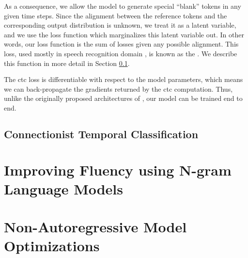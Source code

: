 As a consequence, we allow the model to generate special ``blank'' tokens in
any given time steps. Since the alignment between the reference tokens and the
corresponding output distribution is unknown, we treat it as a latent variable,
and we use the loss function which marginalizes this latent variable out. In
other words, our loss function is the sum of losses given any possible
alignment. This loss, used mostly in speech recognition domain
\citep{graves2006connectionist}, is known as the . We describe
this function in more detail in Section \ref{subsec:ctc}.

The \gls{ctc} loss is differentiable with respect to the model parameters,
which means we can back-propagate the gradients returned by the \gls{ctc}
computation. Thus, unlike the originally proposed architectures of
\citet{gu2017nonautoregressive}, our model can be trained end to end.


\subsection{Connectionist Temporal Classification}
\label{subsec:ctc}






\section{Improving Fluency using N-gram Language Models}
\label{sec:nat-lm}





\section{Non-Autoregressive Model Optimizations}
\label{sec:nat-opt}



